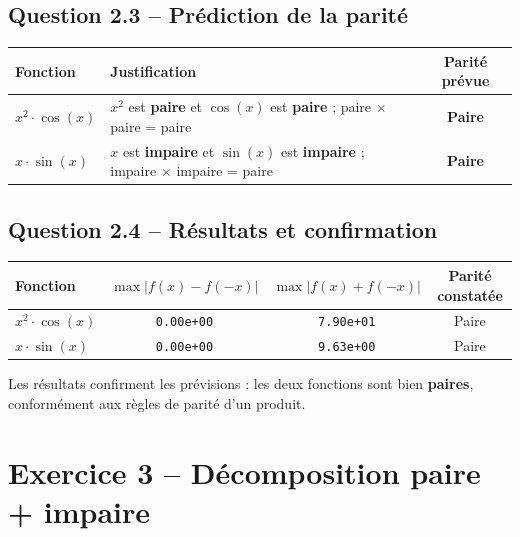 \documentclass[12pt,a4paper]{article}
\begin{document}
\subsection*{Question 2.3 -- Prédiction de la parité}

\begin{repbox}
\renewcommand{\arraystretch}{1.8}
\begin{center}
\begin{tabular}{|l|p{7cm}|c|}
    \hline
    \textbf{Fonction} & \textbf{Justification} & \textbf{Parité prévue} \\
    \hline
    $x^2 \cdot \cos(x)$ & $x^2$ est \textbf{paire} et $\cos(x)$ est \textbf{paire} ; paire $\times$ paire = paire & \textbf{Paire} \\[6pt]
    \hline
    $x \cdot \sin(x)$ & $x$ est \textbf{impaire} et $\sin(x)$ est \textbf{impaire} ; impaire $\times$ impaire = paire & \textbf{Paire} \\[6pt]
    \hline
\end{tabular}
\end{center}
\end{repbox}

\subsection*{Question 2.4 -- Résultats et confirmation}

\renewcommand{\arraystretch}{2}
\begin{center}
\begin{tabular}{|l|c|c|c|}
    \hline
    \textbf{Fonction} & $\max|f(x)-f(-x)|$ & $\max|f(x)+f(-x)|$ & \textbf{Parité constatée} \\
    \hline
    $x^2 \cdot \cos(x)$ & \texttt{0.00e+00} & \texttt{7.90e+01} & Paire \\
    \hline
    $x \cdot \sin(x)$ & \texttt{0.00e+00} & \texttt{9.63e+00} & Paire \\
    \hline
\end{tabular}
\end{center}

\begin{repbox}
Les résultats confirment les prévisions : les deux fonctions sont bien \textbf{paires}, conformément aux règles de parité d'un produit.
\end{repbox}

\section*{Exercice 3 -- Décomposition paire + impaire}
\end{document}
